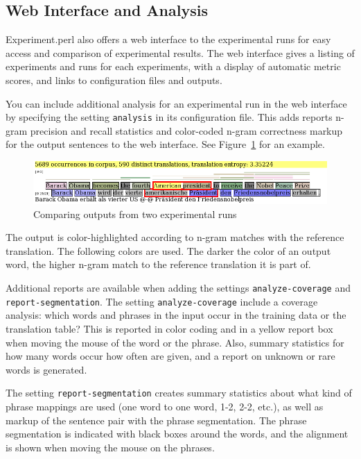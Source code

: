 \documentclass{pbml}
\begin{document}
\subsection{Web Interface and Analysis}

Experiment.perl also offers a web interface to the experimental runs for easy access and comparison of experimental results. The web interface gives a listing of experiments and runs for each experiments, with a display of automatic metric scores, and links to configuration files and outputs.

You can include additional analysis for an experimental run in the web interface by specifying the setting {\tt analysis} in its configuration file.
This adds reports n-gram precision and recall statistics and color-coded n-gram correctness markup for the output sentences to the web interface. See Figure~\ref{ems-annotation} for an example. 

\begin{figure}
\begin{center}
\includegraphics[scale=0.45]{ems-annotation.png}
\end{center}
\caption{Comparing outputs from two experimental runs}
\label{ems-annotation}
\end{figure}

The output is color-highlighted according to n-gram matches with the reference translation. The following colors are used. The darker the color of an output word, the higher n-gram match to the reference translation it is part of.

Additional reports are available when adding the  settings {\tt analyze-coverage} and {\tt report-segmentation}.
The setting {\tt analyze-coverage} include a coverage analysis: which words and phrases in the input occur in the training data or the translation table? This is reported in color coding and in a yellow report box when moving the mouse of the word or the phrase. Also, summary statistics for how many words occur how often are given, and a report on unknown or rare words is generated.


The setting {\tt report-segmentation} creates summary statistics about what kind of phrase mappings are used (one word to one word, 1-2, 2-2, etc.), as well as markup of the sentence pair with the phrase segmentation. The phrase segmentation is indicated with black boxes around the words, and the alignment is shown when moving the mouse on the phrases.
\end{document}
